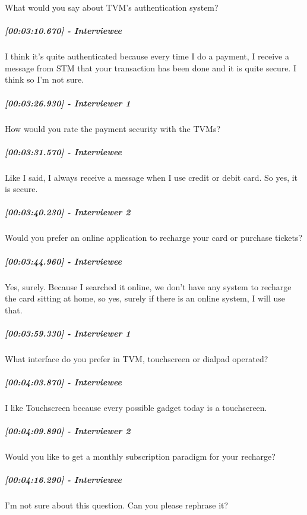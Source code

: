 \documentclass[a4paper,12pt]{article}
\begin{document}
What would you say about TVM's authentication system?

\hypertarget{interviewee-17}{%
\subparagraph{{[}00:03:10.670{]} - Interviewee}\label{interviewee-17}}

I think it's quite authenticated because every time I do a payment, I
receive a message from STM that your transaction has been done and it is
quite secure. I think so I'm not sure.

\hypertarget{interviewer-1-10}{%
\subparagraph{{[}00:03:26.930{]} - Interviewer
1}\label{interviewer-1-10}}

How would you rate the payment security with the TVMs?

\hypertarget{interviewee-18}{%
\subparagraph{{[}00:03:31.570{]} - Interviewee}\label{interviewee-18}}

Like I said, I always receive a message when I use credit or debit card.
So yes, it is secure.

\hypertarget{interviewer-2-10}{%
\subparagraph{{[}00:03:40.230{]} - Interviewer
2}\label{interviewer-2-10}}

Would you prefer an online application to recharge your card or purchase
tickets?

\hypertarget{interviewee-19}{%
\subparagraph{{[}00:03:44.960{]} - Interviewee}\label{interviewee-19}}

Yes, surely. Because I searched it online, we don't have any system to
recharge the card sitting at home, so yes, surely if there is an online
system, I will use that.

\hypertarget{interviewer-1-11}{%
\subparagraph{{[}00:03:59.330{]} - Interviewer
1}\label{interviewer-1-11}}

What interface do you prefer in TVM, touchscreen or dialpad operated?

\hypertarget{interviewee-20}{%
\subparagraph{{[}00:04:03.870{]} - Interviewee}\label{interviewee-20}}

I like Touchscreen because every possible gadget today is a touchscreen.

\hypertarget{interviewer-2-11}{%
\subparagraph{{[}00:04:09.890{]} - Interviewer
2}\label{interviewer-2-11}}

Would you like to get a monthly subscription paradigm for your recharge?

\hypertarget{interviewee-21}{%
\subparagraph{{[}00:04:16.290{]} - Interviewee}\label{interviewee-21}}

I'm not sure about this question. Can you please rephrase it?
\end{document}

